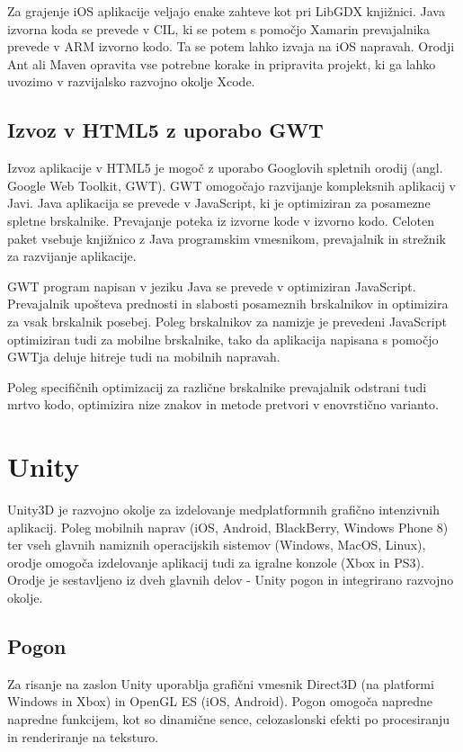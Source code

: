 Za grajenje iOS aplikacije veljajo enake zahteve kot pri LibGDX knjižnici. Java izvorna koda se prevede v CIL, ki se potem s pomočjo Xamarin prevajalnika prevede v ARM izvorno kodo. Ta se potem lahko izvaja na iOS napravah. Orodji Ant ali Maven opravita vse potrebne korake in pripravita projekt, ki ga lahko uvozimo v razvijalsko razvojno okolje Xcode.

\subsection{Izvoz v HTML5 z uporabo GWT}

Izvoz aplikacije v HTML5 je mogoč z uporabo Googlovih spletnih orodij (angl. Google Web Toolkit, GWT). GWT omogočajo razvijanje kompleksnih aplikacij v Javi. Java aplikacija se prevede v JavaScript, ki je optimiziran za posamezne spletne brskalnike. Prevajanje poteka iz izvorne kode v izvorno kodo. Celoten paket vsebuje knjižnico z Java programskim vmesnikom, prevajalnik in strežnik za razvijanje aplikacije.

GWT program napisan v jeziku Java se prevede v optimiziran JavaScript. Prevajalnik upošteva prednosti in slabosti posameznih brskalnikov in optimizira za vsak brskalnik posebej. Poleg brskalnikov za namizje je prevedeni JavaScript optimiziran tudi za mobilne brskalnike, tako da aplikacija napisana s pomočjo GWTja deluje hitreje tudi na mobilnih napravah.

Poleg specifičnih optimizacij za različne brskalnike prevajalnik odstrani tudi mrtvo kodo, optimizira nize znakov in metode pretvori v enovrstično varianto.

\section{Unity}
\label{sec:unity}

Unity3D \cite{unity} je razvojno okolje za izdelovanje medplatformnih grafično intenzivnih aplikacij. Poleg mobilnih naprav (iOS, Android, BlackBerry, Windows Phone 8) ter vseh glavnih namiznih operacijskih sistemov (Windows, MacOS, Linux), orodje omogoča izdelovanje aplikacij tudi za igralne konzole (Xbox in PS3). Orodje je sestavljeno iz dveh glavnih delov - Unity pogon in integrirano razvojno okolje.

\subsection{Pogon}

Za risanje na zaslon Unity uporablja grafični vmesnik Direct3D (na platformi Windows in Xbox) in OpenGL ES (iOS, Android). Pogon omogoča napredne napredne funkcijem, kot so dinamične sence, celozaslonski efekti po procesiranju in renderiranje na teksturo. 

